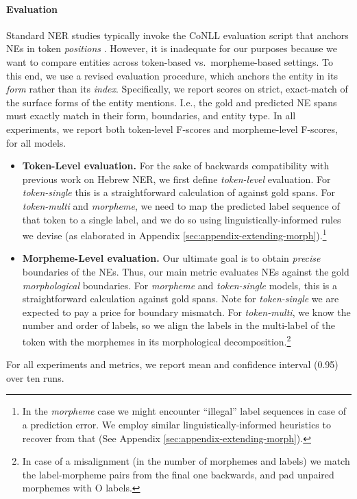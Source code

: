 \documentclass[11pt,a4paper]{article}
\newcommand{\TOKMACRO}{{\em token-single}\xspace}
\newcommand{\MULMACRO}{{\em token-multi}\xspace}
\newcommand{\MORMACRO}{{\em morpheme}\xspace}
\begin{document}
\paragraph{Evaluation} 

Standard NER studies typically invoke the CoNLL evaluation script that anchors NEs in token {\em positions}  \cite{conll2003}. However, it is inadequate for our purposes because we want to compare entities across token-based vs.\ morpheme-based settings. To this end, we use a  revised evaluation procedure, which anchors the entity in its {\em form} rather than its {\em index}. 
Specifically, we report  scores on strict, exact-match of the surface forms of the entity mentions. I.e.,  the gold and predicted NE spans must exactly match in their form, boundaries, and  entity type. 
In all experiments, we report   both token-level F-scores and morpheme-level F-scores, for all models. 
\begin{itemize}
\item  {\bf Token-Level evaluation.} 
For the sake of backwards compatibility with  previous work on Hebrew NER, we first define {\em token-level}  evaluation. 
    For \TOKMACRO this is a straightforward calculation of   against gold spans. 
    For \MULMACRO and \MORMACRO, we need to map the predicted label sequence of that token to a single label, and we do so using linguistically-informed rules we devise
    (as elaborated in Appendix \ref{sec:appendix-extending-morph}).\footnote{In the \MORMACRO case we might encounter ``illegal'' label sequences in case of a prediction error.  We employ similar linguistically-informed heuristics to recover from that (See Appendix \ref{sec:appendix-extending-morph}).} 

 
\item {\bf Morpheme-Level evaluation.}
 Our ultimate goal is to obtain {\em precise}   boundaries of the NEs.
 Thus, our main metric evaluates  NEs against the {gold} {\em morphological}  boundaries.  
  For \MORMACRO and \TOKMACRO models, this is a straightforward  calculation against gold spans. Note for  \TOKMACRO we are expected to pay a price for boundary mismatch.
  For \MULMACRO, we  know the number and order of labels, so we align the labels  in the  multi-label of the token with the morphemes in its morphological decomposition.\footnote{In  case of a misalignment  (in the number of morphemes and  labels) we match the label-morpheme pairs from the final one  backwards, and pad unpaired morphemes with O labels.} 
 

\end{itemize}
For all experiments and metrics, we report mean and confidence interval (0.95) over ten runs.
\end{document}
